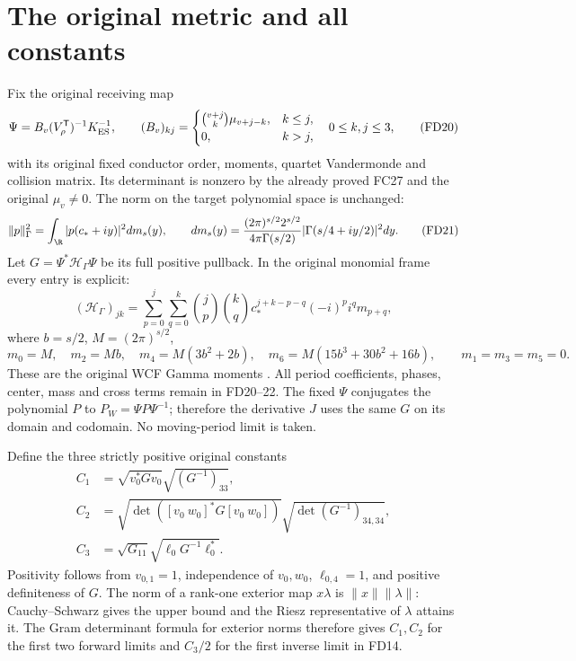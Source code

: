 \section{The original metric and all constants}
Fix the original receiving map
\[
 \Psi=B_v(V_\rho^{\mathsf T})^{-1}K_{\rm ES}^{-1},\qquad
 (B_v)_{kj}=\begin{cases}
 \binom{v+j}{k}\mu_{v+j-k},&k\le j,\\0,&k>j,
 \end{cases}\quad 0\le k,j\le3,
 \tag{FD20}
\]
with its original fixed conductor order, moments,
quartet Vandermonde and collision matrix. Its determinant
is nonzero by the already proved FC27 and the original
\(\mu_v\ne0\). The norm on the target polynomial space
is unchanged:
\[
 \|p\|_\Gamma^2=\int_\R|p(c_*+iy)|^2dm_s(y),\qquad
 dm_s(y)=\frac{(2\pi)^{s/2}2^{s/2}}{4\pi\Gamma(s/2)}
                |\Gamma(s/4+iy/2)|^2dy .
 \tag{FD21}
\]
Let \(G=\Psi^*\mathcal H_\Gamma\Psi\) be its full positive
pullback. In the original monomial frame every entry is
explicit:
\[
 (\mathcal H_\Gamma)_{jk}
 =\sum_{p=0}^j\sum_{q=0}^k
 \binom jp\binom kq c_*^{j+k-p-q}(-i)^pi^q m_{p+q},
 \tag{FD22}
\]
where \(b=s/2\), \(M=(2\pi)^{s/2}\),
\[
 m_0=M,\quad m_2=Mb,\quad m_4=M(3b^2+2b),\quad
 m_6=M(15b^3+30b^2+16b),\qquad m_1=m_3=m_5=0.
\]
These are the original WCF Gamma moments \cite{WCF}.
All period coefficients, phases, center, mass and cross
terms remain in FD20--22. The fixed \(\Psi\) conjugates
the polynomial \(P\) to \(P_W=\Psi P\Psi^{-1}\); therefore
the derivative \(J\) uses the same \(G\) on its domain
and codomain. No moving-period limit is taken.

Define the three strictly positive original constants
\[
\begin{aligned}
 C_1&=\sqrt{v_0^*Gv_0}\sqrt{(G^{-1})_{33}},\\
 C_2&=\sqrt{\det([v_0\ w_0]^*G[v_0\ w_0])}
                       \sqrt{\det(G^{-1})_{34,34}},\\
 C_3&=\sqrt{G_{11}}\sqrt{\ell_0G^{-1}\ell_0^*}.
\end{aligned}\tag{FD23}
\]
Positivity follows from \(v_{0,1}=1\), independence
of \(v_0,w_0\), \(\ell_{0,4}=1\), and positive definiteness
of \(G\). The norm of a rank-one exterior map
\(x\lambda\) is \(\|x\|\|\lambda\|\): Cauchy--Schwarz
gives the upper bound and the Riesz representative of
\(\lambda\) attains it. The Gram determinant formula
for exterior norms therefore gives \(C_1,C_2\) for the
first two forward limits and \(C_3/2\) for the first
inverse limit in FD14.

